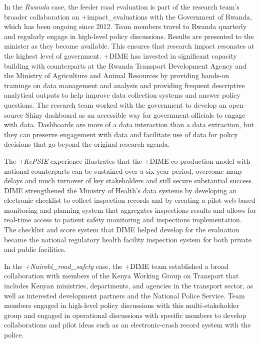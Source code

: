 \documentclass[
]{WileySix}
\begin{document}
In the \emph{Rwanda} case, the feeder road evaluation is part of the research team's broader collaboration on +impact\_evaluations\textbar{} with the Government of Rwanda, which has been ongoing since 2012. Team members travel to Rwanda quarterly and regularly engage in high-level policy discussions. Results are presented to the minister as they become available. This ensures that research impact resonates at the highest level of government. +DIME\textbar{} has invested in significant capacity building with counterparts at the Rwanda Transport Development Agency and the Ministry of Agriculture and Animal Resources by providing hands-on trainings on data management and analysis and providing frequent descriptive analytical outputs to help improve data collection systems and answer policy questions. The research team worked with the government to develop an open-source Shiny dashboard as an accessible way for government officials to engage with data. Dashboards are more of a data interaction than a data extraction, but they can preserve engagement with data and facilitate use of data for policy decisions that go beyond the original research agenda.

The \emph{+KePSIE\textbar{}} experience illustrates that the +DIME\textbar{} co-production model with national counterparts can be sustained over a six-year period, overcome many delays and much turnover of key stakeholders and still secure substantial success. DIME strengthened the Ministry of Health's data systems by developing an electronic checklist to collect inspection records and by creating a pilot web-based monitoring and planning system that aggregates inspections results and allows for real-time access to patient safety monitoring and inspections implementation. The checklist and score system that DIME helped develop for the evaluation became the national regulatory health facility inspection system for both private and public facilities.

In the \emph{+Nairobi\_road\_safety\textbar{}} case, the +DIME\textbar{} team established a broad collaboration with members of the Kenya Working Group on Transport that includes Kenyan ministries, departments, and agencies in the transport sector, as well as interested development partners and the National Police Service. Team members engaged in high-level policy discussions with this multi-stakeholder group and engaged in operational discussions with specific members to develop collaborations and pilot ideas such as an electronic-crash record system with the police.
\end{document}

